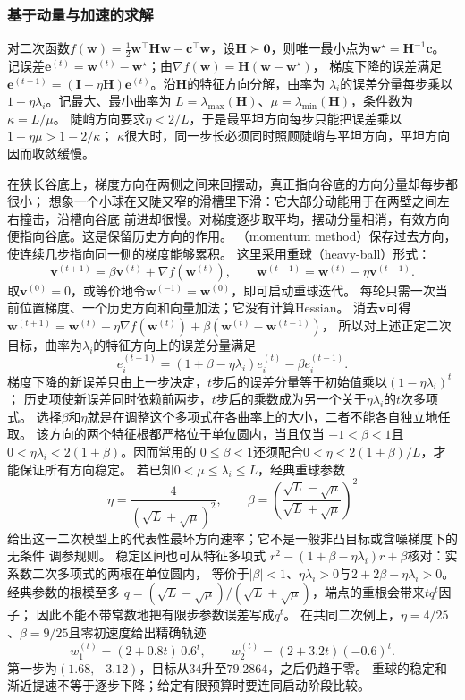 \subsubsection{基于动量与加速的求解}
\label{sec:opt-curvature-acceleration}

对二次函数$f(\bm{w})=\frac12\bm{w}^{\top}\bm{H}\bm{w}
-\bm{c}^{\top}\bm{w}$，设$\bm H\succ\bm 0$，则唯一最小点为$\bm w^\star=\bm H^{-1}\bm c$。
记误差$\bm e^{(t)}=\bm w^{(t)}-\bm w^\star$；由$\nabla f(\bm w)=\bm H(\bm w-\bm w^\star)$，
梯度下降的误差满足
$\bm{e}^{(t+1)}=(\bm{I}-\eta\bm{H})\bm{e}^{(t)}$。沿$\bm H$的特征方向分解，曲率为
$\lambda_i$的误差分量每步乘以$1-\eta\lambda_i$。记最大、最小曲率为
$L=\lambda_{\max}(\bm H)$、$\mu=\lambda_{\min}(\bm H)$，条件数为$\kappa=L/\mu$。
陡峭方向要求$\eta<2/L$，于是最平坦方向每步只能把误差乘以$1-\eta\mu>1-2/\kappa$；
$\kappa$很大时，同一步长必须同时照顾陡峭与平坦方向，平坦方向因而收敛缓慢。

在狭长谷底上，梯度方向在两侧之间来回摆动，真正指向谷底的方向分量却每步都很小；
想象一个小球在又陡又窄的滑槽里下滑：它大部分动能用于在两壁之间左右撞击，沿槽向谷底
前进却很慢。对梯度逐步取平均，摆动分量相消，有效方向便指向谷底。这是保留历史方向的作用。
（momentum method）保存过去方向，使连续几步指向同一侧的梯度能够累积。
这里采用重球（heavy-ball）形式：
\[
  \bm{v}^{(t+1)}=\beta\bm{v}^{(t)}+\nabla f(\bm{w}^{(t)}),
  \qquad
  \bm{w}^{(t+1)}=\bm{w}^{(t)}-\eta\bm{v}^{(t+1)}.
\]
取$\bm v^{(0)}=0$，或等价地令$\bm w^{(-1)}=\bm w^{(0)}$，即可启动重球迭代。
每轮只需一次当前位置梯度、一个历史方向和向量加法；它没有计算Hessian。
消去$\bm v$可得$\bm w^{(t+1)}=\bm w^{(t)}-\eta\nabla f(\bm w^{(t)})
+\beta(\bm w^{(t)}-\bm w^{(t-1)})$，
所以对上述正定二次目标，曲率为$\lambda_i$的特征方向上的误差分量满足
\[
  e_i^{(t+1)}
  =(1+\beta-\eta\lambda_i)e_i^{(t)}-\beta e_i^{(t-1)}.
\]
梯度下降的新误差只由上一步决定，$t$步后的误差分量等于初始值乘以$(1-\eta\lambda_i)^t$；
历史项使新误差同时依赖前两步，$t$步后的乘数成为另一个关于$\eta\lambda_i$的$t$次多项式。
选择$\beta$和$\eta$就是在调整这个多项式在各曲率上的大小，二者不能各自独立地任取。
该方向的两个特征根都严格位于单位圆内，当且仅当
$-1<\beta<1$且$0<\eta\lambda_i<2(1+\beta)$。因而常用的
$0\leq\beta<1$还须配合$0<\eta<2(1+\beta)/L$，才能保证所有方向稳定。
若已知$0<\mu\leq\lambda_i\leq L$，经典重球参数
\[
  \eta=\frac{4}{(\sqrt{L}+\sqrt{\mu})^2},
  \qquad
  \beta=\left(\frac{\sqrt{L}-\sqrt{\mu}}
  {\sqrt{L}+\sqrt{\mu}}\right)^2
\]
给出这一二次模型上的代表性最坏方向速率；它不是一般非凸目标或含噪梯度下的无条件
调参规则。
稳定区间也可从特征多项式
$r^2-(1+\beta-\eta\lambda_i)r+\beta$核对：实系数二次多项式的两根在单位圆内，
等价于$|\beta|<1$、$\eta\lambda_i>0$与$2+2\beta-\eta\lambda_i>0$。
经典参数的根模至多
$q=(\sqrt L-\sqrt\mu)/(\sqrt L+\sqrt\mu)$，端点的重根会带来$tq^t$因子；
因此不能不带常数地把有限步参数误差写成$q^t$。
在共同二次例上，$\eta=4/25$、$\beta=9/25$且零初速度给出精确轨迹
\[
 w_1^{(t)}=(2+0.8t)\,0.6^t,\qquad
 w_2^{(t)}=(2+3.2t)(-0.6)^t.
\]
第一步为$(1.68,-3.12)$，目标从$34$升至$79.2864$，之后仍趋于零。
重球的稳定和渐近提速不等于逐步下降；给定有限预算时要连同启动阶段比较。

